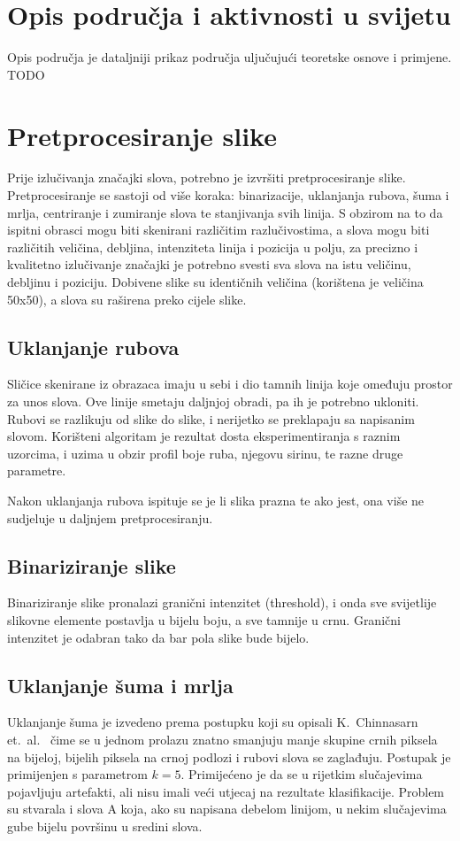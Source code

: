 \documentclass[a4paper,twocolumn,dvipdfm]{article}
\begin{document}
\section{Opis područja i aktivnosti u svijetu}
Opis područja je dataljniji prikaz područja uljučujući teoretske osnove i
primjene. TODO \cite{vamvakasoptical}

\section{Pretprocesiranje slike}
Prije izlučivanja značajki slova, potrebno je izvršiti pretprocesiranje slike.
Pretprocesiranje se sastoji od više koraka: binarizacije, uklanjanja rubova,
šuma i mrlja, centriranje i zumiranje slova te stanjivanja svih linija. S
obzirom na to da ispitni obrasci mogu biti skenirani različitim razlučivostima,
a slova mogu biti različitih veličina, debljina, intenziteta linija i pozicija u
polju, za precizno i kvalitetno izlučivanje značajki je potrebno svesti sva
slova na istu veličinu, debljinu i poziciju. Dobivene slike su identičnih
veličina (korištena je veličina 50x50), a slova su raširena preko cijele slike.

\subsection{Uklanjanje rubova}
Sličice skenirane iz obrazaca imaju u sebi i dio tamnih linija koje omeđuju
prostor za unos slova. Ove linije smetaju daljnjoj obradi, pa ih je potrebno ukloniti.
Rubovi se razlikuju od slike do slike, i nerijetko se preklapaju sa napisanim slovom.
Korišteni algoritam je rezultat dosta eksperimentiranja s raznim uzorcima, i
uzima u obzir profil boje ruba, njegovu sirinu, te razne druge parametre.

Nakon uklanjanja rubova ispituje se je li slika prazna te ako jest, ona više ne
sudjeluje u daljnjem pretprocesiranju.

\subsection{Binariziranje slike}
Binariziranje slike pronalazi granični intenzitet (threshold), i onda sve
svijetlije slikovne elemente postavlja u bijelu boju, a sve tamnije u crnu.
Granični intenzitet je odabran tako da bar pola slike bude bijelo.

\subsection{Uklanjanje šuma i mrlja}
Uklanjanje šuma je izvedeno prema postupku koji su opisali K.\ Chinnasarn et.\
al.\ \cite{chinnasarn2002removing} čime se u jednom prolazu znatno smanjuju
manje skupine crnih piksela na bijeloj, bijelih piksela na crnoj podlozi i
rubovi slova se zaglađuju. Postupak je primijenjen s parametrom $k = 5$.
Primijećeno je da se u rijetkim slučajevima pojavljuju artefakti, ali nisu imali
veći utjecaj na rezultate klasifikacije. Problem su stvarala i slova A koja, ako
su napisana debelom linijom, u nekim slučajevima gube bijelu površinu u sredini
slova.
\end{document}

